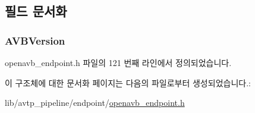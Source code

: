 \subsection{필드 문서화}
\subsubsection[{\texorpdfstring{A\+V\+B\+Version}{AVBVersion}}]{ A\+V\+B\+Version}\hypertarget{structopenavb_endpoint_params___version_callback__t_ae20e1375c7e5bfda67ee623a7ff192b4}{}\label{structopenavb_endpoint_params___version_callback__t_ae20e1375c7e5bfda67ee623a7ff192b4}


openavb\+\_\+endpoint.\+h 파일의 121 번째 라인에서 정의되었습니다.



이 구조체에 대한 문서화 페이지는 다음의 파일로부터 생성되었습니다.\+:\begin{DoxyCompactItemize}
\item 
lib/avtp\+\_\+pipeline/endpoint/\hyperlink{openavb__endpoint_8h}{openavb\+\_\+endpoint.\+h}\end{DoxyCompactItemize}
